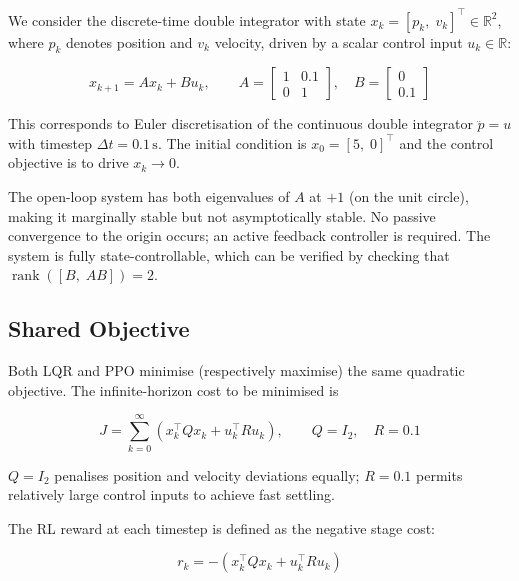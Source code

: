 \documentclass[11pt, a4paper]{article}
\newcommand{\R}{\mathbb{R}}
\newcommand{\T}{^\top}
\begin{document}
We consider the discrete-time double integrator with state $x_k =
[p_k,\; v_k]\T \in \R^2$, where $p_k$ denotes position and $v_k$
velocity, driven by a scalar control input $u_k \in \R$:

\begin{equation}
  x_{k+1} = Ax_k + Bu_k, \qquad
  A = \begin{bmatrix}1 & 0.1 \\ 0 & 1\end{bmatrix}, \quad
  B = \begin{bmatrix}0 \\ 0.1\end{bmatrix}
  \label{eq:dynamics}
\end{equation}

This corresponds to Euler discretisation of the continuous double
integrator $\ddot{p} = u$ with timestep $\Delta t = 0.1\,\mathrm{s}$.
The initial condition is $x_0 = [5,\;0]\T$ and the control objective
is to drive $x_k \to 0$.

The open-loop system has both eigenvalues of $A$ at $+1$ (on the unit
circle), making it marginally stable but not asymptotically stable. No
passive convergence to the origin occurs; an active feedback controller
is required. The system is fully state-controllable, which can be verified
by checking that $\operatorname{rank}([B,\; AB]) = 2$.

\subsection{Shared Objective}

Both LQR and PPO minimise (respectively maximise) the same quadratic
objective. The infinite-horizon cost to be minimised is

\begin{equation}
  J = \sum_{k=0}^{\infty}
      \left( x_k\T Q x_k + u_k\T R u_k \right),
  \qquad
  Q = I_2, \quad R = 0.1
  \label{eq:cost}
\end{equation}

$Q = I_2$ penalises position and velocity deviations equally; $R = 0.1$
permits relatively large control inputs to achieve fast settling.

The RL reward at each timestep is defined as the negative stage cost:

\begin{equation}
  r_k = -\!\left( x_k\T Q x_k + u_k\T R u_k \right)
  \label{eq:reward}
\end{equation}
\end{document}

